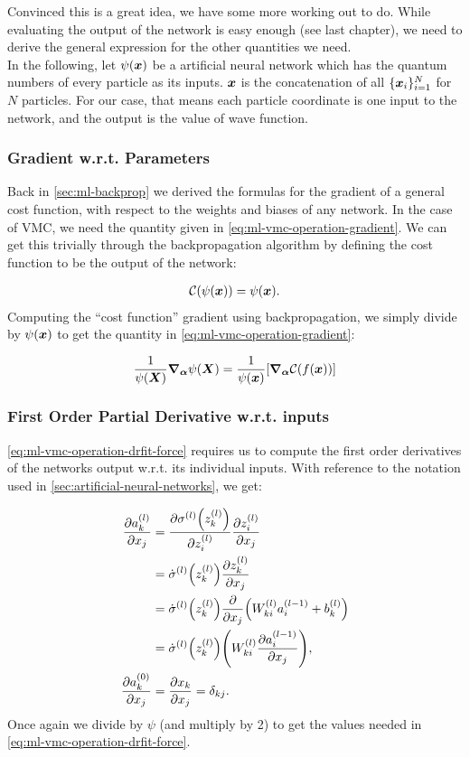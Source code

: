 \documentclass[Thesis.tex]{subfiles}
\begin{document}
Convinced this is a great idea, we have some more working out to do. While
evaluating the output of the network is easy enough (see last chapter), we need
to derive the general expression for the other quantities we need.\\

In the following, let $\psi(\bm{x})$ be a artificial neural network which has the
quantum numbers of every particle as its inputs. $\bm{x}$ is the concatenation of
all $\{\bm{x}_i\}_{i=1}^N$ for $N$ particles. For our case, that means each
particle coordinate is one input to the network, and the output is the value of
wave function.

\subsubsection{Gradient w.r.t. Parameters}

Back in \cref{sec:ml-backprop} we derived the formulas for the gradient of a
general cost function, with respect to the weights and biases of any network. In
the case of VMC, we need the quantity given in
\cref{eq:ml-vmc-operation-gradient}. We can get this trivially through the
backpropagation algorithm by defining the cost function to be the output of the
network:

\begin{align}
  \mathcal{C}(\psi(\bm{x})) = \psi(\bm{x}).
\end{align}
Computing the ``cost function'' gradient using backpropagation, we simply divide
by $\psi(\bm{x})$ to get the quantity in \cref{eq:ml-vmc-operation-gradient}:

\begin{align}
    \frac{1}{\psi(\bm{X})}\grad_{\bm{\alpha}}{\psi(\bm{X})} = \frac{1}{\psi(\bm{x})}\qty[\grad_{\bm{\alpha}}{\mathcal{C}(f(\bm{x}))}]
\end{align}

\subsubsection{First Order Partial Derivative w.r.t. inputs}

\cref{eq:ml-vmc-operation-drfit-force} requires us to compute the first order
derivatives of the networks output w.r.t. its individual inputs. With reference
to the notation used in \cref{sec:artificial-neural-networks}, we get:

\begin{align}
  \pdv{a_k^{(l)}}{x_j} &= \pdv{\sigma^{(l)}\qty(z_k^{(l)})}{z_i^{(l)}}\pdv{z_i^{(l)}}{x_j}\\
  &= \dot\sigma^{(l)}\qty(z_k^{(l)})\pdv{z_k^{(l)}}{x_j}\\
  &= \dot\sigma^{(l)}\qty(z_k^{(l)})\pdv{}{x_j}\qty(W_{ki}^{(l)}a_i^{(l-1)} + b^{(l)}_k)\\
  &= \dot\sigma^{(l)}\qty(z_k^{(l)})\qty(W^{(l)}_{ki}\pdv{a_i^{(l-1)}}{x_j})\label{eq:first-order-partial-nn},\\
  \pdv{a_k^{(0)}}{x_j} &= \pdv{x_k}{x_j} = \delta_{kj}.
\end{align}
Once again we divide by $\psi$ (and multiply by 2) to get the values needed in
\cref{eq:ml-vmc-operation-drfit-force}.
\end{document}
